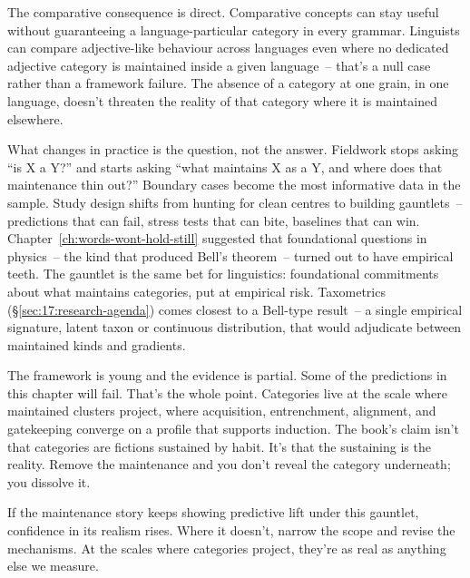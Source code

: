 The comparative consequence is direct. Comparative concepts can stay useful without guaranteeing a language-particular category in every grammar. Linguists can compare adjective-like behaviour across languages even where no dedicated adjective category is maintained inside a given language~-- that's a null case rather than a framework failure. The absence of a category at one grain, in one language, doesn't threaten the reality of that category where it is maintained elsewhere.

What changes in practice is the question, not the answer. Fieldwork stops asking \enquote{is X a Y?} and starts asking \enquote{what maintains X as a Y, and where does that maintenance thin out?} Boundary cases become the most informative data in the sample. Study design shifts from hunting for clean centres to building gauntlets~-- predictions that can fail, stress tests that can bite, baselines that can win. Chapter~\ref{ch:words-wont-hold-still} suggested that foundational questions in physics~-- the kind that produced Bell's theorem~-- turned out to have empirical teeth. The gauntlet is the same bet for linguistics: foundational commitments about what maintains categories, put at empirical risk. Taxometrics (§\ref{sec:17:research-agenda}) comes closest to a Bell-type result~-- a single empirical signature, latent taxon or continuous distribution, that would adjudicate between maintained kinds and gradients.

The framework is young and the evidence is partial. Some of the predictions in this chapter will fail. That's the whole point. Categories live at the scale where maintained clusters project, where acquisition, entrenchment, alignment, and gatekeeping converge on a profile that supports induction. The book's claim isn't that categories are fictions sustained by habit. It's that the sustaining is the reality. Remove the maintenance and you don't reveal the category underneath; you dissolve it.

If the maintenance story keeps showing predictive lift under this gauntlet, confidence in its realism rises. Where it doesn't, narrow the scope and revise the mechanisms. At the scales where categories project, they're as real as anything else we measure.
